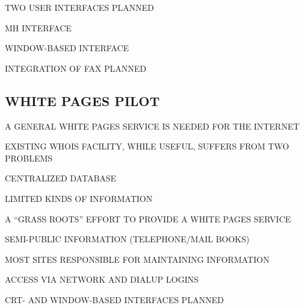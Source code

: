 \begin{bwslide}

\begin{nrtc}
\item	TWO USER INTERFACES PLANNED
    \begin{nrtc}
    \item	MH INTERFACE

    \item	WINDOW-BASED INTERFACE
    \end{nrtc}

\item	INTEGRATION OF FAX PLANNED
\end{nrtc}
\end{bwslide}


\begin{bwslide}
\part*	{WHITE PAGES PILOT}\bf

\begin{nrtc}
\item	A GENERAL WHITE PAGES SERVICE IS NEEDED FOR THE INTERNET

\item	EXISTING WHOIS FACILITY, WHILE USEFUL, SUFFERS FROM TWO PROBLEMS
    \begin{nrtc}
    \item	CENTRALIZED DATABASE

    \item	LIMITED KINDS OF INFORMATION
    \end{nrtc}
\end{nrtc}
\end{bwslide}


\begin{bwslide}

\begin{nrtc}
\item	A ``GRASS ROOTS'' EFFORT TO PROVIDE A WHITE PAGES SERVICE

\item	SEMI-PUBLIC INFORMATION (TELEPHONE/MAIL BOOKS)

\item	MOST SITES RESPONSIBLE FOR MAINTAINING INFORMATION

\item	ACCESS VIA NETWORK AND DIALUP LOGINS

\item	CRT- AND WINDOW-BASED INTERFACES PLANNED
\end{nrtc}
\end{bwslide}


